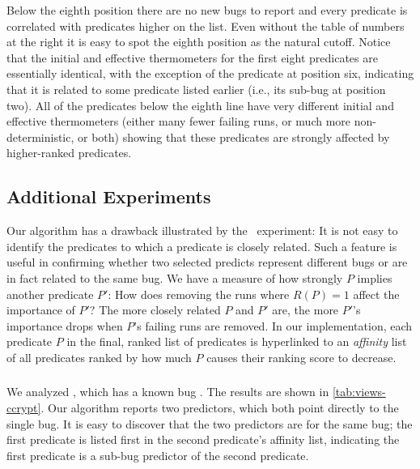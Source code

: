 Below the eighth position there are no new bugs to report and every
predicate is correlated with predicates higher on the list.  Even
without the table of numbers at the right it is easy to spot the
eighth position as the natural cutoff.  Notice that the initial and
effective thermometers for the first eight predicates are essentially
identical, with the exception of the predicate at position six, indicating
that it is related to some predicate listed earlier (i.e., its sub-bug
at position two).  All of the predicates below the eighth line have very
different initial and effective thermometers (either many fewer
failing runs, or much more non-deterministic, or both) showing that these
predicates are strongly affected by 
higher-ranked predicates.

\subsection{Additional Experiments}

Our algorithm has a drawback illustrated by the \moss\ experiment: It
is not easy to identify the predicates to which a predicate is closely
related.  Such a feature is useful in confirming whether two selected
predicts represent different bugs or are in fact related to the same
bug.  We have a measure of how strongly $P$ implies another predicate
$P'$: How does removing the runs where $R(P) = 1$ affect the
importance of $P'$?  The more closely related $P$ and $P'$ are, the
more $P'$'s importance drops when $P$'s failing runs are removed.  In
our implementation, each predicate $P$ in the final, ranked list of
predicates is hyperlinked to an {\em affinity} list of all predicates
ranked by how much $P$ causes their ranking score to decrease.



\subsubsection{\ccrypt}

We analyzed , which has a known bug \cite{Selinger:2003:cqual}.  
The results are shown in \autoref{tab:views-ccrypt}.
Our algorithm reports two predictors, which both point directly to the single bug. 
It is easy to discover that the two predictors are for the same bug; the first predicate
is listed first in the second predicate's affinity list, indicating the first predicate
is a sub-bug predictor of the second predicate.

\subsubsection{\bc}

